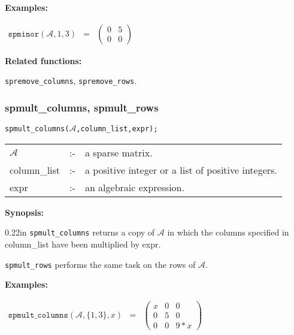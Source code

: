 \textbf{Examples:}

\begin{flushleft}  
\hspace*{0.1in}
\begin{math}  
\begin{array}{ccc}
\texttt{spminor}(\mathcal{A},1,3) & = & 
        \left( \begin{array}{cc} 0 & 5 \\ 0 & 0
 \end{array} \right) 
\end{array}
\end{math}  
\end{flushleft}

\textbf{Related functions:}

\hspace*{0.175in} \texttt{spremove\_columns}, \texttt{spremove\_rows}.


\subsubsection{spmult\_columns, spmult\_rows}

\hspace*{0.175in} \texttt{spmult\_columns($\mathcal{A}$,column\_list,expr);}

\hspace*{0.1in}  
\begin{tabular}{l l l}
$\mathcal{A}$   &:-& a sparse matrix. \\
column\_list &:-& a positive integer or a list of positive integers. \\
expr        &:-& an algebraic expression.
\end{tabular}

\textbf{Synopsis:} 

\begin{addtolength}{\leftskip}{0.22in}
\texttt{spmult\_columns} returns a copy of $\mathcal{A}$ in which
                the columns specified in column\_list have been 
multiplied by expr. 

\texttt{spmult\_rows} performs the same task on the rows of $\mathcal{A}$.

\end{addtolength}

\textbf{Examples:}

\begin{flushleft}  
\hspace*{0.1in}
\begin{math}  
\begin{array}{ccc}
\texttt{spmult\_columns}(\mathcal{A},\{1,3\},x) & = & 
        \left( \begin{array}{ccc} x & 0 & 0 \\ 0 & 5 & 0 \\ 0 & 0 & 9*x 
 \end{array} \right) 
\end{array}
\end{math}  
\end{flushleft}

